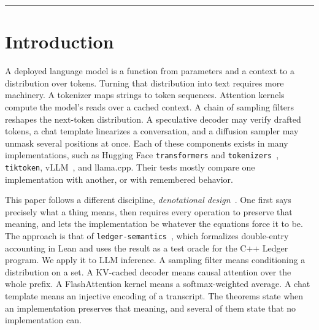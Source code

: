 \documentclass[10pt]{article}
\newcommand{\qptlabel}[1]{{\qptlabelfont\footnotesize\MakeUppercase{#1}}}
\theoremstyle{qpt}
\begin{document}
\vspace{0.3em}
\noindent\qptlabel{Keywords}

\vspace{0.4em}
{\color{Border}\rule{\linewidth}{0.4pt}}

\section{Introduction}

A deployed language model is a function from parameters and a context to a
distribution over tokens. Turning that distribution into text requires more
machinery. A tokenizer maps strings to token sequences. Attention kernels compute
the model's reads over a cached context. A chain of sampling filters reshapes the
next-token distribution. A speculative decoder may verify drafted tokens, a chat
template linearizes a conversation, and a diffusion sampler may unmask several
positions at once. Each of these components exists in many implementations, such as
Hugging Face \texttt{transformers} and \texttt{tokenizers}~\cite{wolf2020transformers},
\texttt{tiktoken}, vLLM~\cite{kwon2023vllm}, and llama.cpp. Their tests mostly
compare one implementation with another, or with remembered behavior.

This paper follows a different discipline, \emph{denotational design}~\cite{elliott2009denotational}.
One first says precisely what a thing means, then requires every operation to
preserve that meaning, and lets the implementation be whatever the equations force
it to be. The approach is that of \texttt{ledger-semantics}~\cite{ledgersemantics},
which formalizes double-entry accounting in Lean and uses the result as a test oracle
for the C++ Ledger program. We apply it to LLM inference. A sampling filter means
conditioning a distribution on a set. A KV-cached decoder means causal attention over
the whole prefix. A FlashAttention kernel means a softmax-weighted average. A chat
template means an injective encoding of a transcript. The theorems state when an
implementation preserves that meaning, and several of them state that no
implementation can.
\end{document}
